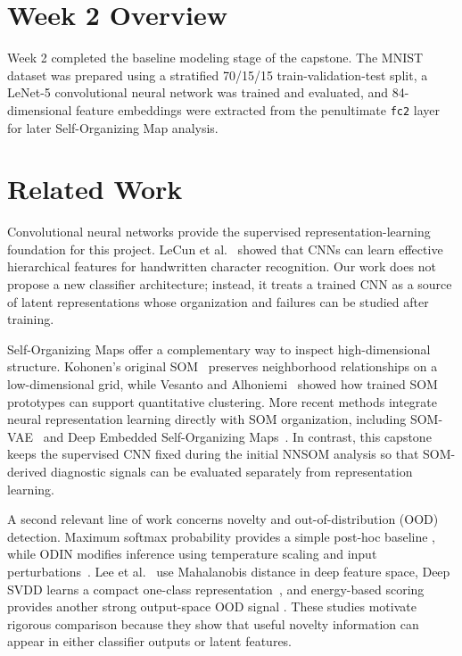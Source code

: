 \documentclass[11pt]{article}
\begin{document}
\setcounter{page}{2}

\section{Week 2 Overview}

Week 2 completed the baseline modeling stage of the capstone. The MNIST
dataset was prepared using a stratified 70/15/15 train-validation-test
split, a LeNet-5 convolutional neural network was trained and evaluated,
and 84-dimensional feature embeddings were extracted from the
penultimate \texttt{fc2} layer for later Self-Organizing Map analysis.

\section{Related Work}

Convolutional neural networks provide the supervised representation-learning
foundation for this project. LeCun et al.~\cite{lecun1998gradient} showed that
CNNs can learn effective hierarchical features for handwritten character
recognition. Our work does not propose a new classifier architecture; instead,
it treats a trained CNN as a source of latent representations whose organization
and failures can be studied after training.

Self-Organizing Maps offer a complementary way to inspect high-dimensional
structure. Kohonen's original SOM~\cite{kohonen1990som} preserves neighborhood
relationships on a low-dimensional grid, while Vesanto and
Alhoniemi~\cite{vesanto2000clustering} showed how trained SOM prototypes can
support quantitative clustering. More recent methods integrate neural
representation learning directly with SOM organization, including
SOM-VAE~\cite{fortuin2019somvae} and Deep Embedded Self-Organizing
Maps~\cite{forest2021desom}. In contrast, this capstone keeps the supervised
CNN fixed during the initial NNSOM analysis so that SOM-derived diagnostic
signals can be evaluated separately from representation learning.

A second relevant line of work concerns novelty and out-of-distribution (OOD)
detection. Maximum softmax probability provides a simple post-hoc baseline
\cite{hendrycks2017baseline}, while ODIN modifies inference using temperature
scaling and input perturbations~\cite{liang2018odin}. Lee et
al.~\cite{lee2018mahalanobis} use Mahalanobis distance in deep feature space,
Deep SVDD learns a compact one-class representation~\cite{ruff2018deep}, and
energy-based scoring provides another strong output-space OOD signal
\cite{liu2020energy}. These studies motivate rigorous comparison because they
show that useful novelty information can appear in either classifier outputs
or latent features.
\end{document}
